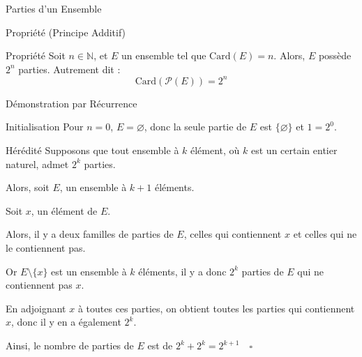 \documentclass{cours}
\begin{document}
\begin{Gpartie}{Parties d'un Ensemble}
\begin{Spartie}{Propriété (Principe Additif)}
        \end{Spartie}
        \begin{Spartie}{Propriété}
            Soit $n\in\mathbb{N}$, et $E$ un ensemble tel que $\text{Card}(E)=n$. Alors, $E$ possède $2^n$ parties. Autrement dit :
            \[\text{Card}(\mathcal{P}(E))=2^n\]
            \begin{SSpartie}{Démonstration par Récurrence}
                \begin{SSSpartie}{Initialisation}
                    Pour $n=0$, $E=\varnothing$, donc la seule partie de $E$ est $\{\varnothing\}$ et $1=2^0$.
                \end{SSSpartie}
                \begin{SSSpartie}{Hérédité}
                    Supposons que tout ensemble à $k$ élément, où $k$ est un certain entier naturel, admet $2^k$ parties. \par
                    Alors, soit $E$, un ensemble à $k+1$ éléments. \par
                    Soit $x$, un élément de $E$. \par
                    Alors, il y a deux familles de parties de $E$, celles qui contiennent $x$ et celles qui ne le contiennent pas. \par
                    Or $E\setminus\{x\}$ est un ensemble à $k$ éléments, il y a donc $2^k$ parties de $E$ qui ne contiennent pas $x$. \par
                    En adjoignant $x$ à toutes ces parties, on obtient toutes les parties qui contiennent $x$, donc il y en a également $2^k$. \par
                    Ainsi, le nombre de parties de $E$ est de $2^k+2^k=2^{k+1}\quad\square$
                \end{SSSpartie}
            \end{SSpartie}
        \end{Spartie}
    \end{Gpartie}
\end{document}
